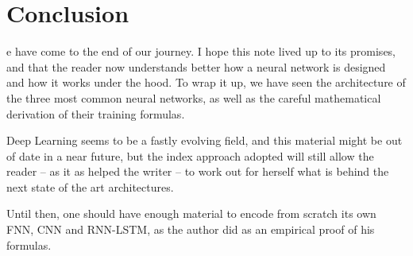 \chapter{Conclusion}

e have come to the end of our journey. I hope this note lived up to its promises, and that the reader now understands better how a neural network is designed and how it works under the hood. To wrap it up, we have seen the architecture of the three most common neural networks, as well as the careful mathematical derivation of their training formulas.

\vspace{0.2cm}

Deep Learning seems to be a fastly evolving field, and this material might be out of date in a near future, but the index approach adopted will still allow the reader -- as it as helped the writer -- to work out for herself what is behind the next state of the art architectures.

\vspace{0.2cm}

Until then, one should have enough material to encode from scratch its own FNN, CNN and RNN-LSTM, as the author did as an empirical proof of his formulas.